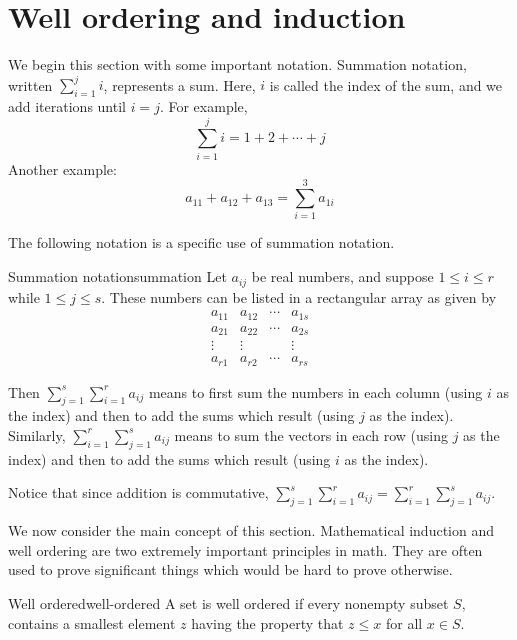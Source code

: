 \section{Well ordering and induction}

\label{well-ordering-section}

We begin this section with some important notation. Summation notation, written $\sum_{i=1}^{j} i $, represents a sum. Here, $i$ is called the index of the sum, and we add iterations until $i=j$. For example, 
\[
\sum_{i=1}^{j} i = 1 + 2 + \cdots + j 
\]
Another example: 
\[
a_{11} + a_{12} + a_{13}  = \sum_{i=1}^{3} a_{1i}
\]

The following notation is a specific use of summation notation. 

\begin{notation}{Summation notation}{summation}
Let $a_{ij}$ be real numbers, and suppose  $1\leq i\leq r$ while $
1\leq j\leq s$. These numbers can be listed in a rectangular array as given by 
\begin{equation*}
\begin{array}{cccc}
a_{11} & a_{12} & \cdots & a_{1s} \\ 
a_{21} & a_{22} & \cdots & a_{2s} \\ 
\vdots & \vdots &  & \vdots \\ 
a_{r1} & a_{r2} & \cdots & a_{rs}
\end{array}
\end{equation*}

Then $\sum_{j=1}^{s}\sum_{i=1}^{r} a_{ij}$ means to first sum the numbers
in each column (using $i$ as the index) and then to add the sums which result (using $j$ as the index). Similarly,  
$\sum_{i=1}^{r}\sum_{j=1}^{s} a_{ij}$ means to sum the vectors in
each row (using $j$ as the index) and then to add the sums which result (using $i$ as the index). 
\end{notation}

Notice that since addition is commutative, $\sum_{j=1}^{s}\sum_{i=1}^{r} a_{ij} = \sum_{i=1}^{r}\sum_{j=1}^{s} a_{ij}$. 

We now consider the main concept of this section. Mathematical induction and well ordering are two extremely important
principles in math. They are often used to prove significant things which
would be hard to prove otherwise.

\begin{definition}{Well ordered}{well-ordered}
 A set is well ordered if every nonempty subset $S,$ contains a
smallest element $z$ having the property that $z\leq x$ for all $x\in S.$
\end{definition}


